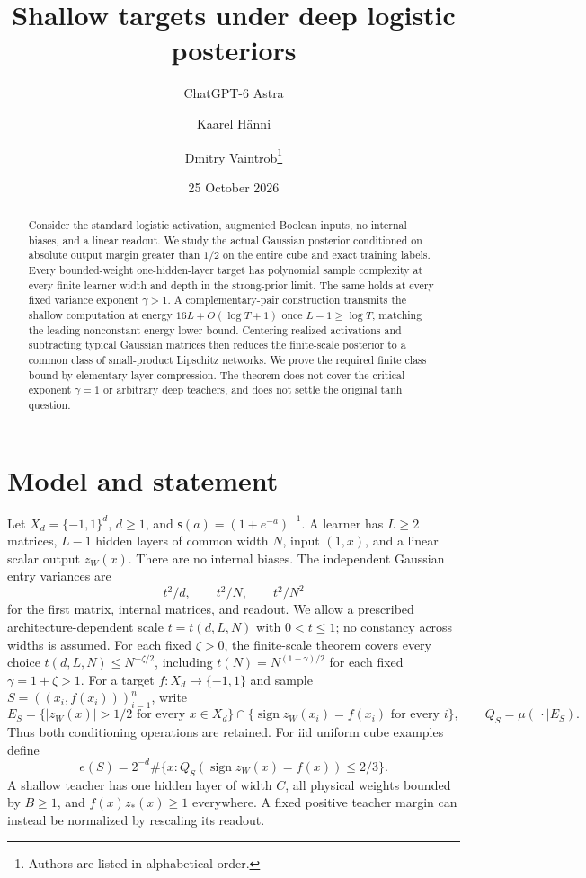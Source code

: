 \documentclass[11pt]{article}
\title{Shallow targets under deep logistic posteriors}
\author{ChatGPT-6 Astra \and Kaarel H\"anni \and Dmitry Vaintrob\thanks{Authors are listed in alphabetical order.}}
\date{25 October 2026}
\theoremstyle{remark}\newtheorem{remark}[theorem]{Remark}
\newcommand{\sig}{\mathsf s}
\begin{document}
\maketitle
\begin{abstract}
Consider the standard logistic activation, augmented Boolean inputs, no
internal biases, and a linear readout. We study the actual Gaussian
posterior conditioned on absolute output margin greater than $1/2$ on the
entire cube and exact training labels. Every bounded-weight one-hidden-layer
target has polynomial sample complexity at every finite learner width and
depth in the strong-prior limit. The same holds at every fixed variance
exponent $\gamma>1$. A complementary-pair construction transmits the shallow
computation at energy $16L+O(\log T+1)$ once $L-1\ge\log T$, matching the leading nonconstant
energy lower bound. Centering realized activations and subtracting typical
Gaussian matrices then reduces the finite-scale posterior to a common
class of small-product Lipschitz networks. We prove the required finite
class bound by elementary layer compression. The theorem does not cover
the critical exponent $\gamma=1$ or arbitrary deep teachers, and does not
settle the original tanh question.
\end{abstract}

\section{Model and statement}

Let $X_d=\{-1,1\}^d$, $d\ge1$, and $\sig(a)=(1+e^{-a})^{-1}$. A learner
has $L\ge2$ matrices, $L-1$ hidden layers of common width $N$, input
$(1,x)$, and a linear scalar output $z_W(x)$. There are no internal
biases. The independent Gaussian entry variances are
\[
 t^2/d,\qquad t^2/N,\qquad t^2/N^2
\]
for the first matrix, internal matrices, and readout. We allow a prescribed
architecture-dependent scale $t=t(d,L,N)$ with $0<t\le1$; no constancy
across widths is assumed. For each fixed $\zeta>0$, the finite-scale theorem covers every choice
$t(d,L,N)\le N^{-\zeta/2}$, including
$t(N)=N^{(1-\gamma)/2}$ for each fixed $\gamma=1+\zeta>1$.
For a target $f:X_d\to\{-1,1\}$ and sample $S=((x_i,f(x_i)))_{i=1}^n$,
write
\[
 E_S=\{|z_W(x)|>1/2\text{ for every }x\in X_d\}
       \cap\{\operatorname{sign}z_W(x_i)=f(x_i)\text{ for every }i\},
 \qquad Q_S=\mu(\,\cdot\mid E_S).
\]
Thus both conditioning operations are retained. For iid uniform cube
examples define
\[
 e(S)=2^{-d}\#\{x:Q_S(\operatorname{sign}z_W(x)=f(x))\le2/3\}.
\]
A shallow teacher has one hidden layer of width $C$, all physical weights
bounded by $B\ge1$, and $f(x)z_*(x)\ge1$ everywhere. A fixed positive
teacher margin can instead be normalized by rescaling its readout.
\end{document}
